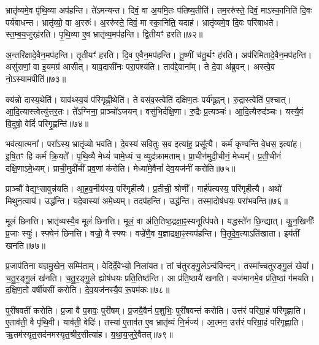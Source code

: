 भ्रातृ॑व्यमे॒व पृ॑थि॒व्या अप॑हन्ति।
ते॑ऽमन्यन्त।
दिवं॒ वा अ॒यमि॒तः प॑तिष्य॒तीति॑।
तम॒ररु॑स्ते॒ दिवं॒ माऽस्का॒निति॑ दि॒वः पर्य॑बाधन्त।
भ्रातृ॑व्यो॒ वा अ॒ररुः॑।
अ॒ररु॑स्ते॒ दिवं॒ मा स्का॒निति॒ यदाह॑।
भ्रातृ॑व्यमे॒व दि॒वः परि॑बाधते।
स्त॒म्ब॒य॒जुर्‌\mbox{}ह॑रति।
पृ॒थि॒व्या ए॒व भ्रातृ॑व्य॒मप॑हन्ति।
द्वि॒तीयꣳ॑ हरति॥७२॥\ip

अ॒न्तरि॑क्षादे॒वैन॒मप॑हन्ति।
तृ॒तीयꣳ॑ हरति।
दि॒व ए॒वैन॒मप॑हन्ति।
तू॒ष्णीं च॑तु॒र्थꣳ ह॑रति।
अप॑रिमितादे॒वैन॒मप॑\-हन्ति।
असु॑राणां॒ वा इ॒यमग्र॑ आसीत्।
याव॒दासी॑नः परा॒पश्य॑ति।
ताव॑द्दे॒वाना᳚म्।
ते दे॒वा अ॑ब्रुवन्।
अस्त्वे॒व नो॒\-ऽस्यामपीति॑॥७३॥\ip

क्य॑न्नो दास्य॒थेति॑।
याव॑थ्स्व॒यं प॑रिगृह्णी॒थेति॑।
ते वस॑व॒स्त्वेति॑ दक्षिण॒तः पर्य॑गृह्णन्।
रु॒द्रास्त्वेति॑ प॒श्चात्।
आ॒दि॒त्यास्त्वेत्यु॑त्तर॒तः।
ते᳚ऽग्निना॒ प्राञ्चो॑\-ऽजयन्।
वसु॑भिर्दक्षि॒णा।
रु॒द्रैः प्र॒त्यञ्चः॑।
आ॒दि॒त्यैरुद॑ञ्चः।
यस्यै॒वं वि॒दुषो॒ वेदिं॑ परिगृ॒ह्णन्ति॑॥७४॥\ip

भव॑त्या॒त्मना᳚।
परा᳚ऽस्य॒ भ्रातृ॑व्यो भवति।
दे॒वस्य॑ सवि॒तुः स॒व इत्या॑ह॒ प्रसू᳚त्यै।
कर्म॑ कृण्वन्ति वे॒धस॒ इत्या॑ह।
इ॒षि॒तꣳ हि कर्म॑ क्रि॒यते᳚।
पृ॒थि॒व्यै मेध्यं॑ चामे॒ध्यं च॒ व्युद॑क्रामताम्।
प्रा॒चीन॑मुदी॒चीनं॒ मेध्यम्᳚।
प्र॒ती॒चीनं॑ दक्षि॒णा\-ऽमे॒ध्यम्।
प्राची॒मुदी॑चीं प्रव॒णां क॑रोति।
मेध्या॑मे॒वैनां᳚ देव॒यज॑नीं करोति॥७५॥\ip

प्राञ्चौ॑ वेद्य॒ꣳ॒सावुन्न॑यति।
आ॒ह॒व॒नीय॑स्य॒ परि॑गृहीत्यै।
प्र॒तीची॒ श्रोणी᳚।
गार्ह॑पत्यस्य॒ परि॑गृहीत्यै।
अथो॑ मिथुन॒त्वाय॑।
उद्ध॑न्ति।
यदे॒वास्या॑ अमे॒ध्यम्।
तदप॑हन्ति।
उद्ध॑न्ति।
तस्मा॒दोष॑धयः॒ परा॑भवन्ति॥७६॥\ip

मूलं॑ छिनत्ति।
भ्रातृ॑व्यस्यै॒व मूलं॑ छिनत्ति।
मूलं॒ वा अ॑ति॒तिष्ठ॒द्रक्षा॒ꣴ॒स्यनूत्पि॑पते।
यद्धस्ते॑न छि॒न्द्यात्।
कु॒न॒खिनीः᳚ प्र॒जाः स्युः॑।
स्फ्येन॑ छिनत्ति।
वज्रो॒ वै स्फ्यः।
वज्रे॑णै॒व य॒ज्ञाद्रक्षा॒ꣴ॒स्यप॑हन्ति।
पि॒तृ॒दे॒व॒त्या\-ऽति॑खाता।
इय॑तीं खनति॥७७॥\ip

प्र॒जा\-प॑तिना यज्ञमु॒खेन॒ सम्मि॑ताम्।
वेदि॑र्दे॒वेभ्यो॒ निला॑यत।
तां च॑तुरङ्गु॒ले\-ऽन्व॑विन्दन्।
तस्मा᳚च्चतुरङ्गु॒लं खेया᳚।
च॒तु॒र॒ङ्गु॒लं ख॑नति।
च॒तु॒र॒ङ्गु॒ले ह्योष॑धयः प्रति॒तिष्ठ॑न्ति।
आ प्र॑ति॒ष्ठायै॑ खनति।
यज॑मानमे॒व प्र॑ति॒ष्ठां ग॑मयति।
द॒क्षि॒ण॒तो वर्\mbox{}षी॑यसीं करोति।
दे॒व॒यज॑नस्यै॒व रू॒पम॑कः॥७८॥\ip

पुरी॑षवतीं करोति।
प्र॒जा वै प॒शवः॒ पुरी॑षम्।
प्र॒जयै॒वैनं॑ प॒शुभिः॒ पुरी॑षवन्तं करोति।
उत्त॑रं परिग्रा॒हं परि॑गृह्णाति।
ए॒ताव॑ती॒ वै पृ॑थि॒वी।
याव॑ती॒ वेदिः॑।
तस्या॑ ए॒ताव॑त ए॒व भ्रातृ॑व्यं नि॒र्भज्य॑।
आ॒त्मन॒ उत्त॑रं परिग्रा॒हं परि॑गृह्णाति।
ऋ॒तम॑स्यृत॒सद॑नमस्यृत॒श्रीर॒सीत्या॑ह।
य॒था॒\-य॒जु\-रे॒वै\-तत्॥७९॥\ip

